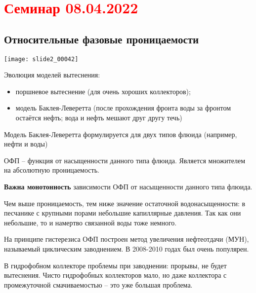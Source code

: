 \documentclass[main.tex]{subfiles}
\begin{document}
\section{\textcolor{red}{Семинар 08.04.2022}}

\subsection{Относительные фазовые проницаемости}

\texttt{[image: slide2\_00042]}

Эволюция моделей вытеснения:
\begin{itemize}
	\item поршневое вытеснение (для очень хороших коллекторов);
	\item модель Баклея-Леверетта (после прохождения фронта воды за фронтом остаётся нефть; вода и нефть мешают друг другу течь)
\end{itemize}

Модель Баклея-Леверетта формулируется для двух типов флюида (например, нефти и воды)

ОФП -- функция от насыщенности данного типа флюида. Является множителем на абсолютную проницаемость.

\textbf{Важна монотонность} зависимости ОФП от насыщенности данного типа флюида.


Чем выше проницаемость, тем ниже значение остаточной водонасыщенности: в песчанике с крупными порами небольшие капиллярные давления. Так как они небольшие, то и намертво связанной воды тоже немного.






На принципе гистерезиса ОФП построен метод увеличения нефтеотдачи (МУН), называемый циклическим заводнением. В 2008-2010 годах был очень популярен.


В гидрофобном коллекторе проблемы при заводнении: прорывы, не будет вытеснения. Чисто гидрофобных коллекторов мало, но даже коллектора с промежуточной смачиваемостью -- это уже большая проблема.


\end{document}
